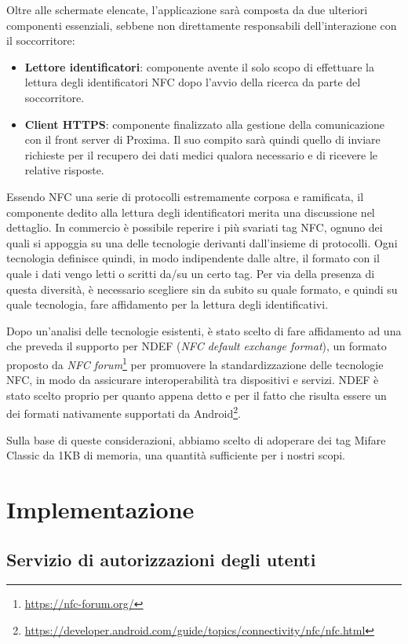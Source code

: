 \documentclass[a4paper,12pt]{report}
\begin{document}
Oltre alle schermate elencate, l'applicazione sarà composta da due ulteriori componenti essenziali, sebbene non direttamente responsabili dell'interazione con il soccorritore:
\begin{itemize}
	\item \textbf{Lettore identificatori}: componente avente il solo scopo di effettuare la lettura degli identificatori NFC dopo l'avvio della ricerca da parte del soccorritore.
	\item \textbf{Client HTTPS}: componente finalizzato alla gestione della comunicazione con il front server di Proxima. Il suo compito sarà quindi quello di inviare richieste per il recupero dei dati medici qualora necessario e di ricevere le relative risposte.  
\end{itemize}

Essendo NFC una serie di protocolli estremamente corposa e ramificata, il componente dedito alla lettura degli identificatori merita una discussione nel dettaglio. In commercio è possibile reperire i più svariati tag NFC, ognuno dei quali si appoggia su una delle tecnologie derivanti dall'insieme di protocolli. Ogni tecnologia definisce quindi, in modo indipendente dalle altre, il formato con il quale i dati vengo letti o scritti da/su un certo tag. Per via della presenza di questa diversità, è necessario scegliere sin da subito su quale formato, e quindi su quale tecnologia, fare affidamento per la lettura degli identificativi.

Dopo un'analisi delle tecnologie esistenti, è stato scelto di fare affidamento ad una che preveda il supporto per NDEF (\emph{NFC default exchange format}), un formato proposto da \emph{NFC forum}\footnote{\url{https://nfc-forum.org/}} per promuovere la standardizzazione delle tecnologie NFC, in modo da assicurare interoperabilità tra dispositivi e servizi. NDEF è stato scelto proprio per quanto appena detto e per il fatto che risulta essere un dei formati nativamente supportati da Android\footnote{\url{https://developer.android.com/guide/topics/connectivity/nfc/nfc.html}}.

Sulla base di queste considerazioni, abbiamo scelto di adoperare dei tag Mifare Classic da 1KB di memoria, una quantità sufficiente per i nostri scopi.


\chapter{Implementazione}

\section{Servizio di autorizzazioni degli utenti}
\end{document}
